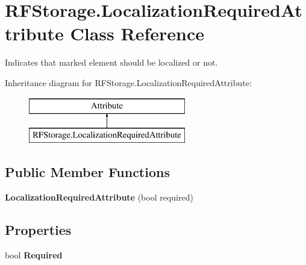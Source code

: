 \hypertarget{class_r_f_storage_1_1_localization_required_attribute}{}\section{R\+F\+Storage.\+Localization\+Required\+Attribute Class Reference}
\label{class_r_f_storage_1_1_localization_required_attribute}


Indicates that marked element should be localized or not.  


Inheritance diagram for R\+F\+Storage.\+Localization\+Required\+Attribute\+:\begin{figure}[H]
\begin{center}
\leavevmode
\includegraphics[height=2.000000cm]{class_r_f_storage_1_1_localization_required_attribute}
\end{center}
\end{figure}
\subsection*{Public Member Functions}
\begin{DoxyCompactItemize}
\item 
\mbox{\label{class_r_f_storage_1_1_localization_required_attribute_ab5d889aa12df48310745f86a132b45fb}} 
{\bfseries Localization\+Required\+Attribute} (bool required)
\end{DoxyCompactItemize}
\subsection*{Properties}
\begin{DoxyCompactItemize}
\item 
\mbox{\label{class_r_f_storage_1_1_localization_required_attribute_aad1160151af5ec0bf170dfdd9c585f4c}} 
bool {\bfseries Required}
\end{DoxyCompactItemize}


